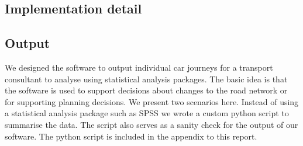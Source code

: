 \subsection{Implementation detail}


\subsection{Output}
We designed the software to output individual car journeys for a transport consultant to analyse using statistical analysis packages.  The basic idea is that the software is used to support decisions about  changes to the road network or for supporting planning decisions.  We present two scenarios here. Instead of using a statistical analysis package such as SPSS we wrote a custom python script to summarise the data.  The script also serves as a sanity check for the output of our software.  The python script is included in the appendix to this report. 



